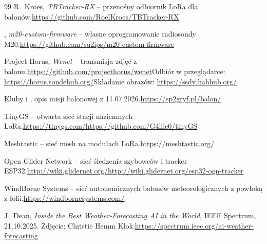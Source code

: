 \begin{thebibliography}{99}
 R.~Kroes, \emph{TBTracker-RX} -- przenośny odbiornik LoRa dla balonów.\newline\url{https://github.com/RoelKroes/TBTracker-RX}

 , \emph{m20-custom-firmware} -- własne oprogramowanie radiosondy M20.\newline\url{https://github.com/sq2ips/m20-custom-firmware}

 Project Horus, \emph{Wenet} -- transmisja zdjęć z balonu.\newline\url{https://github.com/projecthorus/wenet}\newline Odbiór w przeglądarce: \url{https://horus.sondehub.org/}\newline Składanie obrazów: \url{https://ssdv.habhub.org/}

 Kluby  i , opis misji balonowej  z 11.07.2026.\newline\url{https://sp2gryf.pl/balon/}

 TinyGS -- otwarta sieć stacji naziemnych LoRa.\newline\url{https://tinygs.com/}\newline\url{https://github.com/G4lile0/tinyGS}

 Meshtastic -- sieć mesh na modułach LoRa.\newline\url{https://meshtastic.org/}

 Open Glider Network -- sieć śledzenia szybowców i tracker ESP32.\newline\url{http://wiki.glidernet.org/}\newline\url{http://wiki.glidernet.org/esp32-ogn-tracker}

 WindBorne Systems -- sieć autonomicznych balonów meteorologicznych z powłoką z folii.\newline\url{https://windbornesystems.com/}

 J.~Dean, \emph{Inside the Best Weather-Forecasting AI in the World}, IEEE Spectrum, 21.10.2025. Zdjęcie: Christie Hemm Klok.\newline\url{https://spectrum.ieee.org/ai-weather-forecasting}

\end{thebibliography}
